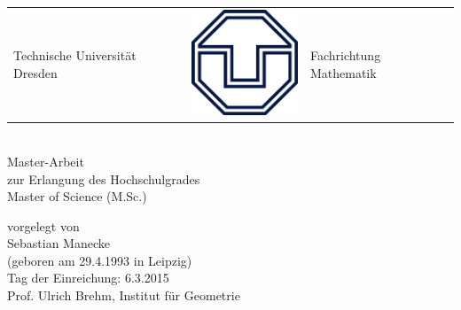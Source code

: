 \begin{titlepage}
\begin{center}


  \begin{tabular}{R{6.9cm} M p{6.9cm}}
    {\Large Technische Universität Dresden}&  \includegraphics[scale =0.25]{TU.png} & \Large{Fachrichtung Mathematik}     
  \end{tabular}

  \vfil
  \makeatletter
  {\Huge\@title}
  \makeatother
  \\[\bigskipamount]
  \vfil
      {\LARGE
        Master-Arbeit
        \\[\bigskipamount]
        zur Erlangung des Hochschulgrades
        \\[\bigskipamount]
        Master of Science  (M.Sc.)
        \\[\bigskipamount]
      }




      vorgelegt von
      \\[\bigskipamount]
      Sebastian Manecke
      \\[\bigskipamount]
      (geboren am 29.4.1993 in Leipzig)
      \\[\bigskipamount]
      Tag der Einreichung: 6.3.2015
      \\[\bigskipamount]
      Prof. Ulrich Brehm, Institut für Geometrie
\end{center}
\end{titlepage}

